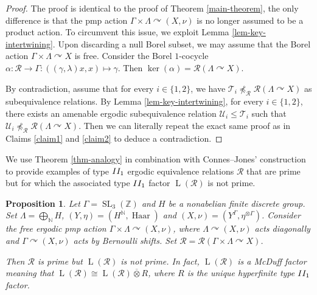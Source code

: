 \documentclass[11pt]{amsart}
\numberwithin{equation}{section}
\theoremstyle{plain}
\newtheorem{prop}[thm]{Proposition}
\theoremstyle{definition}
\newcommand{\N}{\mathbb{N}}
\newcommand{\Z}{\mathbb{Z}}
\newcommand{\ovt}{\mathbin{\overline{\otimes}}}
\newcommand{\SL}{\operatorname{SL}}
\newcommand{\Haar}{\operatorname{Haar}}
\newcommand{\rL}{\operatorname{L}}
\begin{document}
\begin{proof}
The proof is identical to the proof of Theorem \ref{main-theorem}, the only difference is that the pmp action $\Gamma \times \Lambda \curvearrowright (X, \nu)$ is no longer assumed to be a product action. To circumvent this issue, we exploit Lemma \ref{lem-key-intertwining}. Upon discarding a null Borel subset, we may assume that the Borel action $\Gamma \times \Lambda \curvearrowright X$ is free. Consider the Borel $1$-cocycle $\alpha : \mathscr R \to \Gamma : ((\gamma, \lambda) x, x) \mapsto \gamma$. Then $\ker(\alpha) = \mathscr R(\Lambda \curvearrowright X)$.

By contradiction, assume that for every $i \in \{1, 2\}$, we have $\mathscr T_i \npreceq_{\mathscr R} \mathscr R(\Lambda \curvearrowright X)$ as subequivalence relations. By Lemma \ref{lem-key-intertwining}, for every $i \in \{1, 2\}$, there exists an amenable ergodic subequivalence relation $\mathscr U_i \leq \mathscr T_i$ such that $\mathscr U_i \npreceq_{\mathscr R} \mathscr R(\Lambda \curvearrowright X)$. Then we can literally repeat the exact same proof as in Claims \ref{claim1} and \ref{claim2} to deduce a contradiction.
\end{proof}

We use Theorem \ref{thm-analogy} in combination with Connes--Jones'\! construction \cite{CJ81} to provide examples of type ${\rm II_1}$ ergodic equivalence relations $\mathscr R$ that are prime but for which the associated type ${\rm II_1}$ factor $\rL(\mathscr R)$ is not prime.

\begin{prop}\label{prop-counterexample}
Let $\Gamma = \SL_3(\Z)$ and $H$ be a nonabelian finite discrete group. Set $\Lambda = \bigoplus_\N H$, $(Y, \eta) = (H^\N, \Haar)$ and $(X, \nu) = (Y^\Gamma, \eta^{\otimes \Gamma})$. Consider the free ergodic pmp action $\Gamma \times \Lambda \curvearrowright (X, \nu)$, where $\Lambda \curvearrowright (X, \nu)$ acts diagonally and $\Gamma \curvearrowright (X, \nu)$ acts by Bernoulli shifts. Set $\mathscr R = \mathscr R(\Gamma \times \Lambda \curvearrowright X)$.

Then $\mathscr R$ is prime but $\rL(\mathscr R)$ is not prime. In fact, $\rL(\mathscr R)$ is a McDuff factor meaning that $\rL(\mathscr R) \cong \rL(\mathscr R) \ovt R$, where $R$ is the unique hyperfinite type ${\rm II_1}$ factor.
\end{prop}
\end{document}
